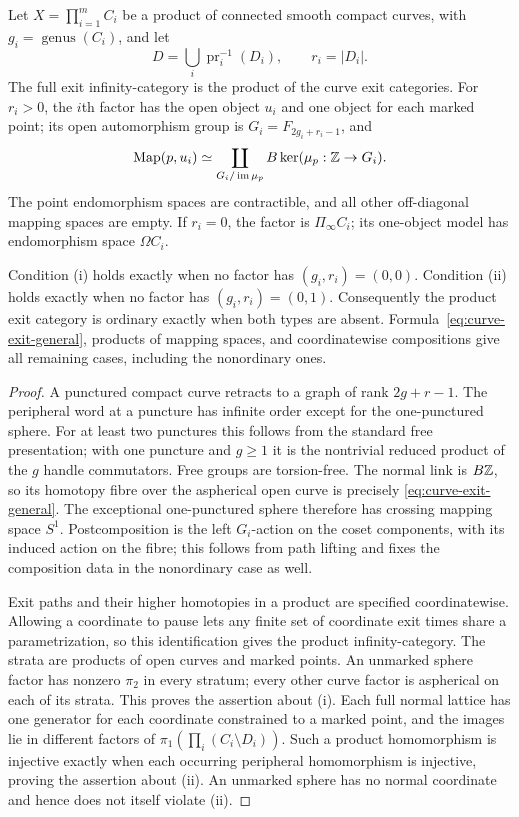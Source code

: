 \begin{proposition}\label{P1e5}
Let $X=\prod_{i=1}^m C_i$ be a product of connected smooth compact
curves, with $g_i=\operatorname{genus}(C_i)$, and let
\[
 D=\bigcup_i\operatorname{pr}_i^{-1}(D_i),\qquad r_i=|D_i|.
\]
The full exit infinity-category is the product of the curve exit
categories. For $r_i>0$, the $i$th factor has the open object $u_i$ and
one object for each marked point; its open automorphism group is
$G_i=F_{2g_i+r_i-1}$, and
\begin{equation}\label{eq:curve-exit-general}
 \operatorname{Map}(p,u_i)\simeq
 \coprod_{G_i/\operatorname{im}\mu_p} B\ker(\mu_p:\mathbb Z\to G_i).
\end{equation}
The point endomorphism spaces are contractible, and all other
off-diagonal mapping spaces are empty. If $r_i=0$, the factor is
$\Pi_\infty C_i$; its one-object model has endomorphism space
$\Omega C_i$.

Condition (i) holds exactly when no factor has $(g_i,r_i)=(0,0)$.
Condition (ii) holds exactly when no factor has $(g_i,r_i)=(0,1)$.
Consequently the product exit category is ordinary exactly when both
types are absent. Formula~\eqref{eq:curve-exit-general}, products of
mapping spaces, and coordinatewise compositions give all remaining
cases, including the nonordinary ones.
\end{proposition}
\begin{proof}
A punctured compact curve retracts to a graph of rank $2g+r-1$.
The peripheral word at a puncture has infinite order except for the
one-punctured sphere. For at least two punctures this follows from the
standard free presentation; with one puncture and $g\ge1$ it is the
nontrivial reduced product of the $g$ handle commutators. Free groups
are torsion-free. The normal link is $B\mathbb Z$, so its homotopy fibre over
the aspherical open curve is precisely
\eqref{eq:curve-exit-general}. The exceptional one-punctured sphere
therefore has crossing mapping space $S^1$. Postcomposition is the
left $G_i$-action on the coset components, with its induced action on
the fibre; this follows from path lifting and fixes the composition
data in the nonordinary case as well.

Exit paths and their higher homotopies in a product are specified
coordinatewise. Allowing a coordinate to pause lets any finite set of
coordinate exit times share a parametrization, so this identification
gives the product infinity-category. The strata are products of open
curves and marked points. An unmarked sphere factor has nonzero
$\pi_2$ in every stratum; every other curve factor is aspherical on
each of its strata. This proves the assertion about (i). Each full
normal lattice has one generator for each coordinate constrained to
a marked point, and the images lie in different factors of
$\pi_1(\prod_i(C_i\setminus D_i))$. Such a product homomorphism is
injective exactly when each occurring peripheral homomorphism is
injective, proving the assertion about (ii). An unmarked sphere has
no normal coordinate and hence does not itself violate (ii).
\end{proof}

